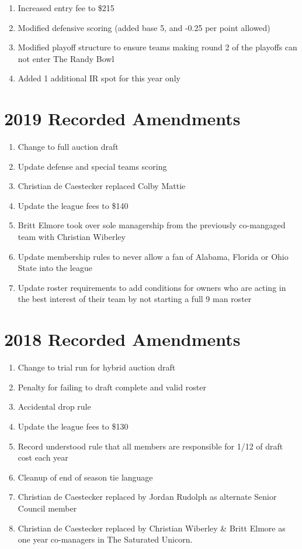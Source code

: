 \documentclass[
]{book}
\providecommand{\tightlist}{%
  \setlength{\itemsep}{0pt}\setlength{\parskip}{0pt}}
\begin{document}
\begin{enumerate}
\def\labelenumi{\arabic{enumi}.}
\tightlist
\item
  Increased entry fee to \$215
\item
  Modified defensive scoring (added base 5, and -0.25 per point allowed)
\item
  Modified playoff structure to ensure teams making round 2 of the playoffs can not enter The Randy Bowl
\item
  Added 1 additional IR spot for this year only
\end{enumerate}

\hypertarget{recorded-amendments-2}{%
\section{2019 Recorded Amendments}\label{recorded-amendments-2}}

\begin{enumerate}
\def\labelenumi{\arabic{enumi}.}
\tightlist
\item
  Change to full auction draft
\item
  Update defense and special teams scoring
\item
  Christian de Caestecker replaced Colby Mattie
\item
  Update the league fees to \$140
\item
  Britt Elmore took over sole managership from the previously co-mangaged team with Christian Wiberley
\item
  Update membership rules to never allow a fan of Alabama, Florida or Ohio State into the league
\item
  Update roster requirements to add conditions for owners who are acting in the best interest of their team by not starting a full 9 man roster
\end{enumerate}

\hypertarget{recorded-amendments-3}{%
\section{2018 Recorded Amendments}\label{recorded-amendments-3}}

\begin{enumerate}
\def\labelenumi{\arabic{enumi}.}
\tightlist
\item
  Change to trial run for hybrid auction draft
\item
  Penalty for failing to draft complete and valid roster
\item
  Accidental drop rule
\item
  Update the league fees to \$130
\item
  Record understood rule that all members are responsible for 1/12 of draft cost each year
\item
  Cleanup of end of season tie language
\item
  Christian de Caestecker replaced by Jordan Rudolph as alternate Senior Council member
\item
  Christian de Caestecker replaced by Christian Wiberley \& Britt Elmore as one year co-managers in The Saturated Unicorn.
\end{enumerate}
\end{document}
